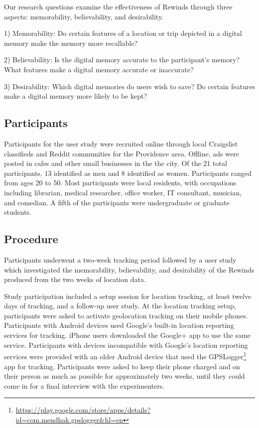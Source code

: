\documentclass{sigchi}
\begin{document}
Our research questions examine the effectiveness of Rewinds through three aspects: memorability, believability, and desirability.

1) Memorability: Do certain features of a location or trip depicted in a digital memory make the memory more recallable? 

2) Believability:  Is the digital memory accurate to the participant's memory? What features make a digital memory accurate or inaccurate?

3) Desirability: Which digital memories do users wish to save? Do certain features make a digital memory more likely to be kept?

\subsection{Participants}
Participants for the user study were recruited online through local Craigslist classifieds and Reddit communities for the Providence area. Offline, ads were posted in cafes and other small businesses in the the city. Of the 21 total participants, 13 identified as men and 8 identified as women. Participants ranged from ages 20 to 50. Most participants were local residents, with occupations including librarian, medical researcher, office worker, IT consultant, musician, and comedian. A fifth of the participants were undergraduate or graduate students.

\subsection{Procedure}
Participants underwent a two-week tracking period followed by a user study which investigated the memorability, believability, and desirability of the Rewinds produced from the two weeks of location data.

Study participation included a setup session for location tracking, at least twelve days of tracking, and a follow-up user study. At the location tracking setup, participants were asked to activate geolocation tracking on their mobile phones. Participants with Android devices used Google's built-in location reporting services for tracking. iPhone users downloaded the Google+ app to use the same service. Participants with devices incompatible with Google's location reporting services were provided with an older Android device that used the GPSLogger\footnote{\url{https://play.google.com/store/apps/details?id=com.mendhak.gpslogger&hl=en}} app for tracking. Participants were asked to keep their phone charged and on their person as much as possible for approximately two weeks, until they could come in for a final interview with the experimenters.
\end{document}
